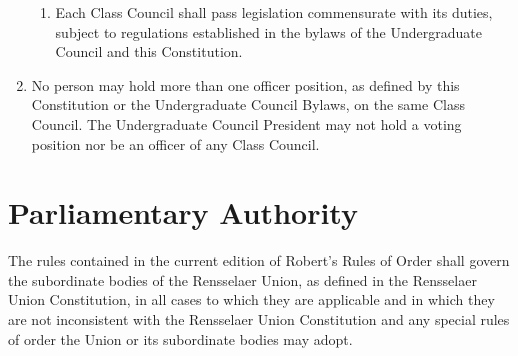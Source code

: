 \begin{enumerate}
\begin{enumerate}
\item Each Class Council shall pass legislation commensurate with its duties, subject to regulations established in the bylaws of the Undergraduate Council and this Constitution.
\end{enumerate}
\item No person may hold more than one officer position, as defined by this Constitution or the Undergraduate Council Bylaws, on the same Class Council. The Undergraduate Council President may not hold a voting position nor be an officer of any Class Council.
\end{enumerate}

\section{Parliamentary Authority}
The rules contained in the current edition of Robert's Rules of Order shall govern the subordinate bodies of the Rensselaer Union, as defined in the Rensselaer Union Constitution, in all cases to which they are applicable and in which they are not inconsistent with the Rensselaer Union Constitution and any special rules of order the Union or its subordinate bodies may adopt.
